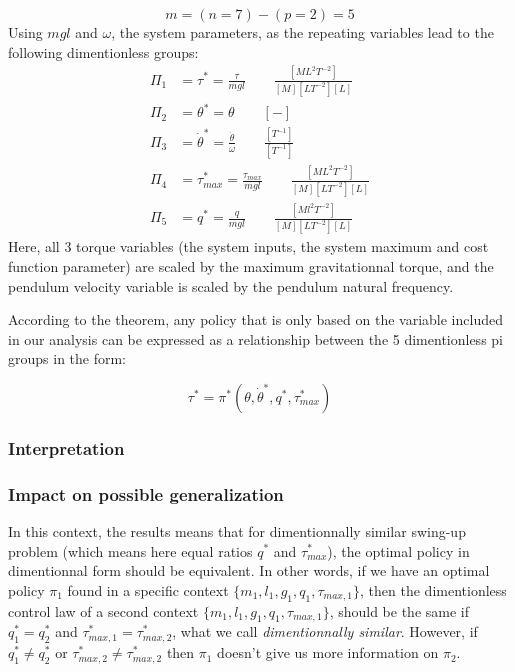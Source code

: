 \begin{equation}
m = (n = 7 ) - ( p = 2 ) = 5
\end{equation}
Using $mgl$ and $\omega$, the system parameters, as the repeating variables lead to the following dimentionless groups:
\begin{align}
\Pi_1 &= \tau^* = \frac{\tau}{mgl} \quad \quad \frac{[ML^2T^{-2}]}{[M][LT^{-2}][L]} \\
\Pi_2 &= \theta^* = \theta \quad \quad [-]\\
\Pi_3 &= \dot{\theta}^* = \frac{ \dot{\theta}  }{ \omega } \quad \quad \frac{[T^{-1}]}{[T^{-1}]} \\
\Pi_4 &= \tau_{max}^* = \frac{\tau_{max}}{mgl} \quad \quad \frac{[ML^2T^{-2}]}{[M][LT^{-2}][L]} \\
\Pi_5 &= q^* = \frac{q}{mgl} \quad \quad \frac{[Ml^2T^{-2}]}{[M][LT^{-2}][L]} 
\end{align}
Here, all 3 torque variables (the system inputs, the system maximum and cost function parameter) are scaled by the maximum gravitationnal torque, and the pendulum velocity variable is scaled by the pendulum natural frequency.


According to the theorem, any policy that is only based on the variable included in our analysis can be expressed as a relationship between the 5 dimentionless pi groups in the form:

\begin{equation}
\tau^*
=
\pi^* \left(
\theta, \dot{\theta}^*,
q^* , \tau_{max}^* 
\right)
\end{equation}

\subsubsection{Interpretation}

\subsubsection{Impact on possible generalization}

In this context, the results means that for dimentionnally similar swing-up problem (which means here equal ratios $q^*$ and $\tau_{max}^*$), the optimal policy in dimentionnal form should be equivalent. In other words, if we have an optimal policy $\pi_1$ found in a specific context $\{m_1,l_1,g_1,q_1,\tau_{max,1}\}$, then the dimentionless control law of a second context $\{m_1,l_1,g_1,q_1,\tau_{max,1}\}$, should be the same if $q^*_1 = q^*_2$ and $\tau_{max,1}^* = \tau_{max,2}^*$, what we call \textit{dimentionnally similar}. However, if $q^*_1 \neq q^*_2$ or $\tau_{max,2}^* \neq \tau_{max,2}^*$ then $\pi_1$ doesn't give us more information on $\pi_2$.





